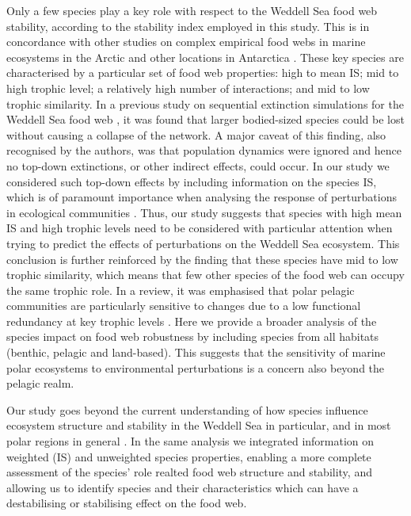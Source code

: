\documentclass[gc, manuscript]{copernicus}
\begin{document}
Only a few species play a key role with respect to the Weddell Sea food
web stability, according to the stability index employed in this study.
This is in concordance with other studies on complex empirical food webs
in marine ecosystems in the Arctic and other locations in Antarctica
\citep{Kortsch2015, Marina2018, Rodriguez2022}. These key species are
characterised by a particular set of food web properties: high to mean
IS; mid to high trophic level; a relatively high number of interactions;
and mid to low trophic similarity. In a previous study on sequential
extinction simulations for the Weddell Sea food web \citep{Jacob2011},
it was found that larger bodied-sized species could be lost without
causing a collapse of the network. A major caveat of this finding, also
recognised by the authors, was that population dynamics were ignored and
hence no top-down extinctions, or other indirect effects, could occur.
In our study we considered such top-down effects by including
information on the species IS, which is of paramount importance when
analysing the response of perturbations in ecological communities
\citep{McCann1998, Montoya2009, Novak2011}. Thus, our study suggests
that species with high mean IS and high trophic levels need to be
considered with particular attention when trying to predict the effects
of perturbations on the Weddell Sea ecosystem. This conclusion is
further reinforced by the finding that these species have mid to low
trophic similarity, which means that few other species of the food web
can occupy the same trophic role. In a review, it was emphasised that
polar pelagic communities are particularly sensitive to changes due to a
low functional redundancy at key trophic levels \citep{Murphy2016}. Here
we provide a broader analysis of the species impact on food web
robustness by including species from all habitats (benthic, pelagic and
land-based). This suggests that the sensitivity of marine polar
ecosystems to environmental perturbations is a concern also beyond the
pelagic realm.

\clearpage
\conclusions[Conclusions]

Our study goes beyond the current understanding of how species influence
ecosystem structure and stability in the Weddell Sea in particular, and
in most polar regions in general \citep{Murphy2016, McCormack2021}. In
the same analysis we integrated information on weighted (IS) and
unweighted species properties, enabling a more complete assessment of
the species' role realted food web structure and stability, and allowing
us to identify species and their characteristics which can have a
destabilising or stabilising effect on the food web.
\end{document}
